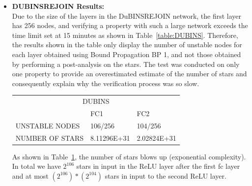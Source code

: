\begin{itemize}
    \item \textbf{DUBINSREJOIN Results:} \\
    Due to the size of the layers in the DuBINSREJOIN network, the first layer has 256 nodes, and verifying a property with such a large network exceeds the time limit set at 15 minutes as shown in Table~\ref{table:DUBINS}. 
    Therefore, the results shown in the table only display the number of unstable nodes for each layer obtained using Bound Propagation BP 1, and not those obtained by performing a post-analysis on the stars. 
    The test was conducted on only one property to provide an overestimated estimate of the number of stars and consequently explain why the verification process was so slow.

    \begin{table}[H]        
        \centering
        \begin{tabular}{lll}
        \toprule
        \multicolumn{3}{c}{DUBINS}  \\
        \cmidrule(r){1-3}
                        & FC1                                & FC2                                \\
        UNSTABLE NODES  & {\color[HTML]{B4C6E7} 106/256}     & {\color[HTML]{B4C6E7} 104/256}     \\
        NUMBER OF STARS & {\color[HTML]{C00000} 8.11296E+31} & {\color[HTML]{C00000} 2.02824E+31}
        \end{tabular}
        \label{table:DUBINS-ANALISY}
    \end{table}

    As shown in Table~\ref{table:DUBINS-ANALISY}, the number of stars blows up (exponential complexity). In total we have $2^{106}$ stars in input in the ReLU layer after the first fc layer and  at most $(2^{106})*(2^{104})$ stars in input to the second ReLU layer.

\end{itemize}

